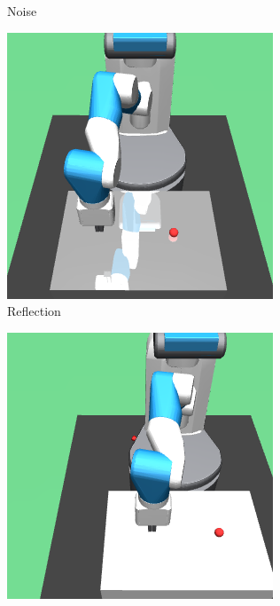 \begin{figure}[h!]
\begin{subfigure}{0.32\textwidth}
    \caption{Noise}
  \end{subfigure}
  \begin{subfigure}{0.32\textwidth}
    \includegraphics[width=\textwidth]{figures/chapter6/test_observations/reflection}
    \caption{Reflection}
  \end{subfigure}
  \begin{subfigure}{0.32\textwidth}
    \includegraphics[width=\textwidth]{figures/chapter6/test_observations/translation}

\end{subfigure}
\end{figure}
